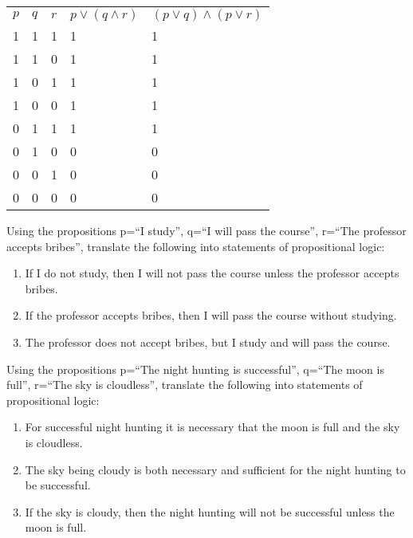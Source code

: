 \documentclass[solution, letterpaper]{cs20inclass}
\begin{document}
\begin{solution}

\begin{table}[h]
\centering
\label{my-label}
\begin{tabular}{lllll}
$p$ & $q$ & $r$ & $p \lor (q \land r)$ & $(p \lor q) \land (p \lor r)$ \\
1 & 1 & 1 & 1                    & 1                           \\
1 & 1 & 0 & 1                    & 1                           \\
1 & 0 & 1 & 1                    & 1                           \\
1 & 0 & 0 & 1                    & 1                           \\
0 & 1 & 1 & 1                    & 1                           \\
0 & 1 & 0 & 0                    & 0                           \\
0 & 0 & 1 & 0                    & 0                           \\
0 & 0 & 0 & 0                    & 0                          
\end{tabular}
\end{table}

\end{solution}

\problem

\subproblem	
Using the propositions p=``I study'', q=``I will pass the course'', r=``The professor accepts bribes'',  translate the following into statements of propositional logic: 
	\begin{enumerate}
	\item If I do not study, then I will not pass the course unless the professor accepts bribes.
	\item If the professor accepts bribes, then I will pass the course without studying.
	\item The professor does not accept bribes, but I study and will pass the course.
	\end{enumerate}
	
	
\subproblem Using the propositions p=``The night hunting is successful'', q=``The moon is full'', r=``The sky is cloudless'', translate the following into statements of propositional logic: 
	
	\begin{enumerate}
	\item For successful night hunting it is necessary that the moon is full and the sky is cloudless.
	\item The sky being cloudy is both necessary and sufficient for the night hunting to be successful.
	\item  If the sky is cloudy, then the night hunting will not be successful unless the moon is full.
	\end{enumerate}
\end{document}
